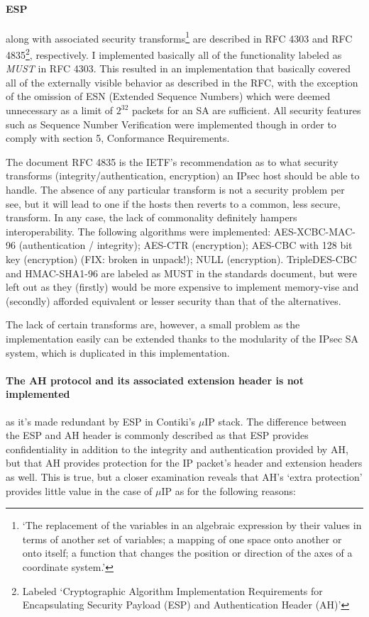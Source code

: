 \documentclass[final,a4paper,twoside,11pt,onecolumn]{report}
\begin{document}
\paragraph{ESP} along with associated security transforms\footnote{`The replacement of the variables in an algebraic expression by their values in terms of another set of variables; a mapping of one space onto another or onto itself; a function that changes the position or direction of the axes of a coordinate system.'\cite{wiki:transforms}} are described in RFC 4303\cite{rfc4303} and RFC 4835\cite{rfc4835}\footnote{Labeled `Cryptographic Algorithm Implementation Requirements for Encapsulating Security Payload (ESP) and Authentication Header (AH)'}, respectively. I implemented basically all of the functionality labeled as \emph{MUST} in RFC 4303. This resulted in an implementation that basically covered all of the externally visible behavior as described in the RFC, with the exception of the omission of ESN (Extended Sequence Numbers) which were deemed unnecessary as a limit of $2^{32}$ packets for an SA are sufficient. All security features such as Sequence Number Verification\citep[3.4.3]{rfc4303} were implemented though in order to comply with section 5, Conformance Requirements\citep[section 5]{rfc4303}.

The document RFC 4835 is the IETF's recommendation as to what security transforms (integrity/authentication, encryption) an IPsec host should be able to handle. The absence of any particular transform is not a security problem per see, but it will lead to one if the hosts then reverts to a common, less secure, transform. In any case, the lack of commonality definitely hampers interoperability. The following algorithms were implemented: AES-XCBC-MAC-96\cite{rfc3566} (authentication / integrity); AES-CTR\cite{rfc3686} (encryption); AES-CBC with 128 bit key\cite{rfc3602} (encryption) (FIX: broken in unpack!); NULL\cite{rfc2410} (encryption). TripleDES-CBC\cite{rfc2451} and HMAC-SHA1-96\cite{rfc2404} are labeled as MUST in the standards document\cite{rfc4835}, but were left out as they (firstly) would be more expensive to implement memory-vise and (secondly) afforded equivalent or lesser security than that of the alternatives.

The lack of certain transforms are, however, a small problem as the implementation easily can be extended thanks to the modularity of the IPsec SA system, which is duplicated in this implementation.

\paragraph{The AH protocol and its associated extension header is not implemented} as it's made redundant by ESP in Contiki's $\mu$IP stack.
\label{para:ah-not-impl}
The difference between the ESP and AH header is commonly described as that ESP provides confidentiality in addition to the integrity and authentication provided by AH, but that AH provides protection for the IP packet's header and extension headers as well. This is true, but a closer examination reveals that AH's `extra protection' provides little value in the case of $\mu$IP as for the following reasons:
\end{document}
